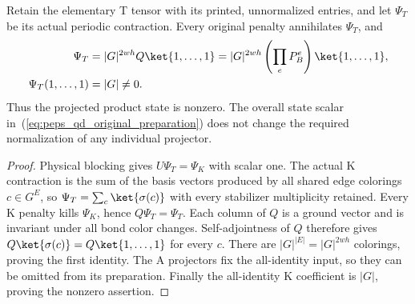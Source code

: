 \begin{theorem}
    \label{thm:peps_qd_original_preparation}

    Retain the elementary T tensor with its printed, unnormalized entries,
    and let $\Psi_T$ be its actual periodic contraction. Every original
    penalty annihilates $\Psi_T$, and
    \begin{align}
        \Psi_T
          &=|G|^{2wh}Q\ket{1,\ldots,1}
           =|G|^{2wh}\left(\prod_e P_B^e\right)\ket{1,\ldots,1},
        \label{eq:peps_qd_original_preparation}\\
        \Psi_T(1,\ldots,1)&=|G|\ne0.
    \end{align}
    Thus the projected product state is nonzero. The overall state scalar
    in~(\ref{eq:peps_qd_original_preparation}) does not change the required
    normalization of any individual projector.
\end{theorem}
\begin{proof}
    Physical blocking gives $U\Psi_T=\Psi_K$ with scalar one. The actual
    K contraction is the sum of the basis vectors produced by all shared
    edge colorings $c\in G^E$, so
    $\Psi_T=\sum_c\ket{\sigma(c)}$ with every stabilizer multiplicity retained.
    Every K penalty kills $\Psi_K$, hence $Q\Psi_T=\Psi_T$.
    Each column of $Q$ is a ground vector and is invariant under all bond
    color changes. Self-adjointness of $Q$ therefore gives
    $Q\ket{\sigma(c)}=Q\ket{1,\ldots,1}$ for every $c$.
    There are $|G|^{|E|}=|G|^{2wh}$ colorings, proving the first identity.
    The A projectors fix the all-identity input, so they can be omitted
    from its preparation. Finally the all-identity K coefficient is
    $|G|$, proving the nonzero assertion.
\end{proof}
